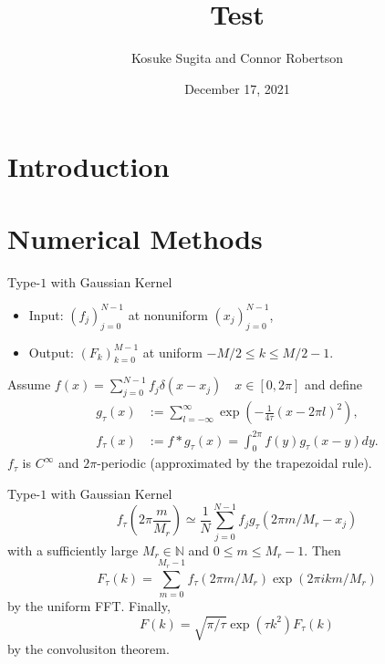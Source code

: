 \documentclass{beamer}
\title{Test}
\author{Kosuke Sugita and Connor Robertson}
\date{December 17, 2021}
\begin{document}
\frame{\titlepage}

\section{Introduction}
\begin{frame}
    \sectionpage
\end{frame}

\section{Numerical Methods}
\begin{frame}
    \sectionpage
\end{frame}

\begin{frame}{Type-$1$ with Gaussian Kernel}
  \begin{itemize}
    \item Input: $(f_{j})_{j=0}^{N-1}$ at nonuniform $(x_{j})_{j=0}^{N-1}$,
    \item Output: $(F_{k})_{k=0}^{M-1}$ at uniform $-M/2 \le k \le M/2-1$.
  \end{itemize}
  Assume $f(x) = \sum_{j=0}^{N-1}f_{j}\delta(x - x_{j}) \quad x \in [0,2\pi]$ and define
  \begin{align}
    g_{\tau}(x) &:= \sum_{l=-\infty}^{\infty}\exp\left(-\frac{1}{4\tau}(x-2\pi l)^2\right), \\
    f_{\tau}(x) &:= f\ast g_{\tau} (x) 
      = \int_{0}^{2\pi} f(y)g_{\tau}(x-y) dy.
  \end{align}
  $f_{\tau}$ is $C^{\infty}$ and $2\pi$-periodic (approximated by the trapezoidal rule).
\end{frame}

\begin{frame}{Type-$1$ with Gaussian Kernel}
  \begin{equation}
      f_{\tau}(2\pi\frac{m}{M_{r}}) 
    \simeq \frac{1}{N}\sum_{j=0}^{N-1} f_{j} g_{\tau}(2\pi m/M_{r} - x_{j})
  \end{equation}
  with a sufficiently large $M_{r} \in \mathbb{N}$ and $0 \le m \le M_{r}-1$. Then
  \begin{equation}
    F_{\tau}(k) = \sum_{m=0}^{M_{r}-1}f_{\tau}(2\pi m/M_{r})\exp(2\pi ikm/M_{r})
  \end{equation}
  by the uniform FFT. Finally, 
  \begin{equation}
    F(k) = \sqrt{\pi/\tau}\exp(\tau k^2)F_{\tau}(k)
  \end{equation}
  by the convolusiton theorem.
\end{frame}
\end{document}
